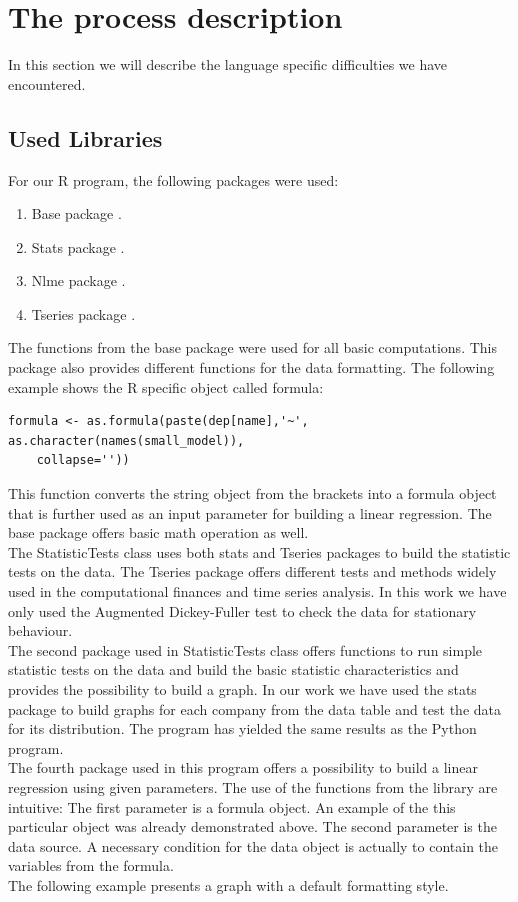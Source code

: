 \documentclass[
  twoside,
  11pt, a4paper,
  footinclude=true,
  headinclude=true,
  cleardoublepage=empty
]{scrreprt}
\begin{document}
    \section{The process description}
    In this section we will describe the language specific difficulties we have encountered.
    \subsection{Used Libraries}
    For our R program, the following packages were used:
    \begin{enumerate}
        \item Base package \cite{r:BasePackage}.
        \item Stats package \cite{r:Stats}.
        \item Nlme package \cite{r:Nlme}.
        \item Tseries package \cite{r:Tseries}.
    \end{enumerate}
    The functions from the base package were used for all basic computations. This package also provides different functions for the data formatting. The following example shows the R specific object called formula:
    \begin{lstlisting}[basicstyle=\footnotesize]
    formula <- as.formula(paste(dep[name],'~', as.character(names(small_model)),
    collapse=''))
    \end{lstlisting}
    This function converts the string object from the brackets into a formula object that is further used as an input parameter for building a linear regression. The base package offers basic math operation as well.\\
    The StatisticTests class uses both stats and Tseries packages to build the statistic tests on the data. The Tseries package offers different tests and methods widely used in the computational finances and time series analysis. In this work we have only used the Augmented Dickey-Fuller test to check the data for stationary behaviour.\\
    The second package used in StatisticTests class offers functions to run simple statistic tests on the data and build the basic statistic characteristics and provides the possibility to build a graph. In our work we have used the stats package to build graphs for each company from the data table and test the data for its distribution. The program has yielded the same results as the Python program.\\
    The fourth package used in this program offers a possibility to build a linear regression using given parameters. The use of the functions from the library are intuitive:
    The first parameter is a formula object. An example of the this particular object was already demonstrated above. The second parameter is the data source. A necessary condition for the data object is actually to contain the variables from the formula.\\
    The following example presents a graph with a default formatting style.
    
\end{document}
